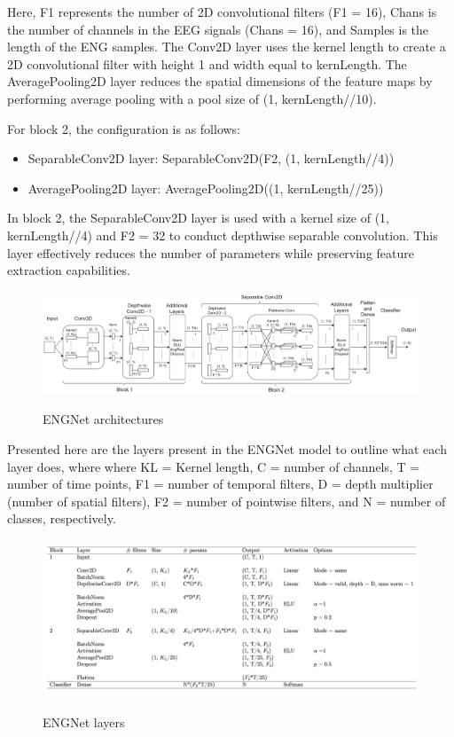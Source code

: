 \documentclass{Configuration_Files/PoliMi3i_thesis}
\begin{document}
Here, F1 represents the number of 2D convolutional filters (F1 = 16), Chans is the number of channels in the EEG signals (Chans = 16), and Samples is the length of the ENG samples. The Conv2D layer uses the kernel length to create a 2D convolutional filter with height 1 and width equal to kernLength. The AveragePooling2D layer reduces the spatial dimensions of the feature maps by performing average pooling with a pool size of (1, kernLength//10). \cite{tesiDavide}

For block 2, the configuration is as follows:
\begin{itemize}
\item SeparableConv2D layer: SeparableConv2D(F2, (1, kernLength//4))
\item AveragePooling2D layer: AveragePooling2D((1, kernLength//25))
\end{itemize}

In block 2, the SeparableConv2D layer is used with a kernel size of (1, kernLength//4) and F2 = 32 to conduct depthwise separable convolution. This layer effectively reduces the number of parameters while preserving feature extraction capabilities.

\begin{figure}[H]
	\includegraphics[scale=0.4]{engNet_arch.png}
	\centering
    \label{engNet_params_2}
    \caption{ENGNet architectures \cite{tesiDavide}}
\end{figure}

Presented here are the layers present in the ENGNet model to outline what each layer does, where where KL = Kernel length, C = number of channels, T = number of time points, F1 = number of temporal filters, D = depth multiplier (number of spatial filters), F2 = number of pointwise filters, and N = number of classes, respectively.


\begin{figure}[H]
	\includegraphics[scale=0.25]{engNet_layers.png}
	\centering
    \label{engNet_params_3}
    \caption{ENGNet layers \cite{tesiDavide}}
\end{figure}
\end{document}
